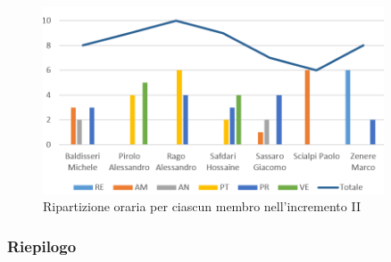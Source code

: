 \begin{figure}[!htb]   
    \centering
    \includegraphics[width=0.9\textwidth]{Images/per3}
	\caption{Ripartizione oraria per ciascun membro nell'incremento II}
\end{figure}

\subsubsection{Riepilogo}

